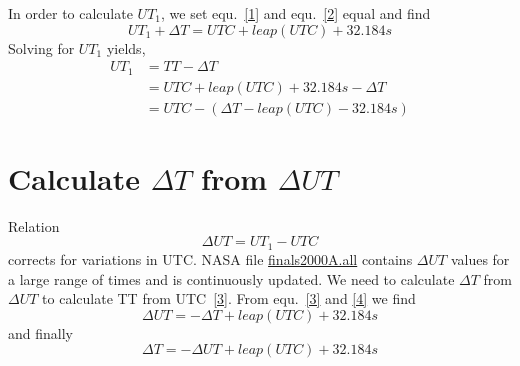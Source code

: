 \documentclass[]{article}
\begin{document}
In order to calculate $UT_{1}$, we set equ.~\ref{1} and equ.~\ref{2} equal and find
\begin{equation}
UT_{1} + \Delta T = UTC + leap(UTC) + 32.184s
\end{equation}
Solving for $UT_{1}$ yields,
\begin{align}
\label{3}
UT_{1} &= TT - \Delta T \\
       &= UTC + leap(UTC) + 32.184s - \Delta T \\
       &= UTC - \left( \Delta T - leap(UTC) - 32.184s \right)
\end{align}

\section{Calculate $\Delta T$ from $\Delta UT$}

Relation
\begin{equation}
\label{4}
\Delta UT = UT_{1} - UTC
\end{equation}
corrects for variations in UTC.
NASA file \href{https://cddis.nasa.gov/archive/products/iers/finals2000A.all}{finals2000A.all} contains
$\Delta UT$ values for a large range of times and is continuously updated.
We need to calculate $\Delta T$ from $\Delta UT$ to calculate TT from UTC~\ref{3}.
From equ.~\ref{3} and \ref{4} we find
\begin{equation}
\label{5}
\Delta UT = -\Delta T + leap(UTC) + 32.184s
\end{equation}
and finally
\begin{equation}
\label{6}
\Delta T = -\Delta UT + leap(UTC) + 32.184s
\end{equation}

 

\end{document}
